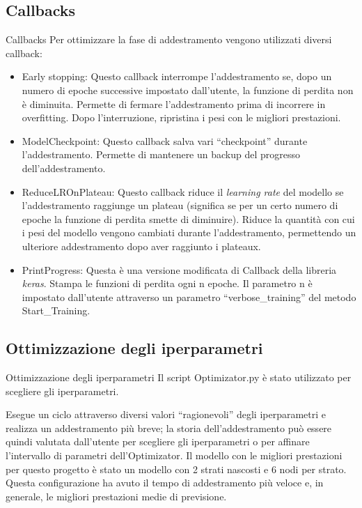 \documentclass{beamer}
\begin{document}
\subsection{Callbacks}
\begin{frame}{Callbacks}
Per ottimizzare la fase di addestramento vengono utilizzati diversi callback:
\pause
    \begin{itemize}
        \item Early stopping:
			Questo callback interrompe l'addestramento se, dopo un numero di epoche successive impostato dall'utente, la funzione di perdita non è diminuita. Permette di fermare l'addestramento prima di incorrere in overfitting. Dopo l'interruzione, ripristina i pesi con le migliori prestazioni.
\pause        
\item ModelCheckpoint:
				Questo callback salva vari ``checkpoint'' durante l'addestramento. Permette di mantenere un backup del progresso dell'addestramento.
\pause        
\item ReduceLROnPlateau:
				Questo callback riduce il \emph{learning rate} del modello se l'addestramento raggiunge un plateau (significa se per un certo numero di epoche la funzione di perdita smette di diminuire). Riduce la quantità con cui i pesi del modello vengono cambiati durante l'addestramento, permettendo un ulteriore addestramento dopo aver raggiunto i plateaux.
\pause			
\item PrintProgress:
				Questa è una versione modificata di Callback della libreria \emph{keras}. Stampa le funzioni di perdita ogni n epoche. Il parametro n è impostato dall'utente attraverso un parametro ``verbose\_training'' del metodo Start\_Training.
    \end{itemize}
\end{frame}



\subsection{Ottimizzazione degli iperparametri}
\begin{frame}{Ottimizzazione degli iperparametri}
	Il script Optimizator.py è stato utilizzato per scegliere gli iperparametri.

	Esegue un ciclo attraverso diversi valori ``ragionevoli'' degli iperparametri e realizza un addestramento più breve; la storia dell'addestramento può essere quindi valutata dall'utente per scegliere gli iperparametri o per affinare l'intervallo di parametri dell'Optimizator.
\pause
	Il modello con le migliori prestazioni per questo progetto è stato un modello con 2 strati nascosti e 6 nodi per strato. Questa configurazione ha avuto il tempo di addestramento più veloce e, in generale, le migliori prestazioni medie di previsione.

\end{frame}
\end{document}
